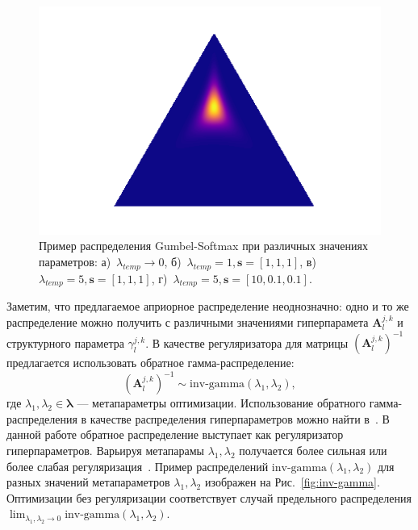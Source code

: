 \begin{figure}
\begin{minipage}[t]{.2\textwidth}
\subcaption{}
\end{minipage}
\hfill
 \begin{minipage}[t]{.2\textwidth}
   \includegraphics[width=\textwidth]{plots/notebooks/gs5_shift.png}
\subcaption{}
\end{minipage}

\caption{Пример распределения Gumbel-Softmax при различных значениях параметров: а)~$\lambda_{temp}\to0$, б)~$\lambda_{temp}=1, \mathbf{s}=[1,1,1]$, в)~$\lambda_{temp}=5, \mathbf{s}=[1,1,1]$, г)~$\lambda_{temp}=5, \mathbf{s}=[10,0.1,0.1].$}
\label{fig:gs}

\end{figure}


Заметим, что предлагаемое априорное распределение неоднозначно: одно и то же распределение  можно получить с различными значениями гиперпарамета $\mathbf{A}^{j,k}_l$ и структурного параметра $\gamma^{j,k}_l$. В качестве регуляризатора для матрицы $(\mathbf{A}^{j,k}_l)^{-1}$ предлагается использовать обратное гамма-распределение:
\[
    (\mathbf{A}^{j,k}_l)^{-1} \sim \text{inv-gamma}(\lambda_1,\lambda_2),
\]
где $\lambda_1,\lambda_2 \in \boldsymbol{\lambda}$ --- метапараметры оптимизации. 
Использование обратного гамма-распределения в качестве распределения гиперпараметров можно найти в~\cite{bishop,mackay}. В данной работе обратное распределение выступает как регуляризатор гиперпараметров.
Варьируя метапарамы $\lambda_1,\lambda_2$ получается  более сильная или более слабая регуляризация~\cite{rvm}. Пример распределений $\text{inv-gamma}(\lambda_1,\lambda_2)$ для разных значений метапараметров $\lambda_1,\lambda_2$ изображен на Рис.~\ref{fig:inv-gamma}. Оптимизации без регуляризации соответствует случай предельного распределения $\lim_{\lambda_1,\lambda_2\to 0}\text{inv-gamma}(\lambda_1, \lambda_2)$.

